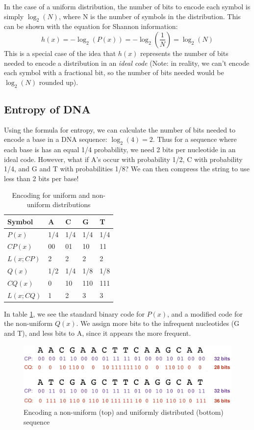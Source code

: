 \documentclass[12pt]{article}
\begin{document}
In the case of a uniform distribution, the number of bits to encode each symbol is simply $\log_2(N)$, where N is the number of symbols in the distribution. This can be shown with the equation for Shannon information:
$$h(x) = -\log_2(P(x)) = -\log_2\left(\frac{1}{N}\right) = \log_2(N)$$
This is a special case of the idea that $h(x)$ represents the number of bits needed to encode a distribution in an \textit{ideal code} (Note: in reality, we can't encode each symbol with a fractional bit, so the number of bits needed would be $\log_2(N)$ rounded up).
\subsection{Entropy of DNA}
Using the formula for entropy, we can calculate the number of bits needed to encode a base in a DNA sequence: $\log_2(4) = 2$. Thus for a sequence where each base is has an equal 1/4 probability, we need 2 bits per nucleotide in an ideal code. However, what if A's occur with probability 1/2, C with probability 1/4, and G and T with probabilities 1/8? We can then compress the string to use less than 2 bits per base!
\begin{table}[h]
\centering
    \label{tab:code}
    \begin{tabular}{l|llll}
    Symbol    & A   & C   & G   & T   \\ \hline
    $P(x)$    & 1/4 & 1/4 & 1/4 & 1/4 \\
    $CP(x)$   & 00  & 01  & 10  & 11  \\
    $L(x;CP)$ & 2   & 2   & 2   & 2   \\ \hline
    $Q(x)$    & 1/2 & 1/4 & 1/8 & 1/8 \\
    $CQ(x)$   & 0   & 10  & 110 & 111 \\
    $L(x;CQ)$ & 1   & 2   & 3   & 3  
    \end{tabular}
    \caption{Encoding for uniform and non-uniform distributions}
\end{table}
In table \ref{tab:code}, we see the standard binary code for $P(x)$, and a modified code for the non-uniform $Q(x)$. We assign more bits to the infrequent nucleotides (G and T), and less bits to A, since it appears the more frequent.
\begin{figure}[h]
    \centering
    \includegraphics[width=.7\linewidth]{ideal_code.png}
    \caption{Encoding a non-uniform (top) and uniformly distributed (bottom) sequence}
    \label{fig:my_label}
\end{figure}
\end{document}
